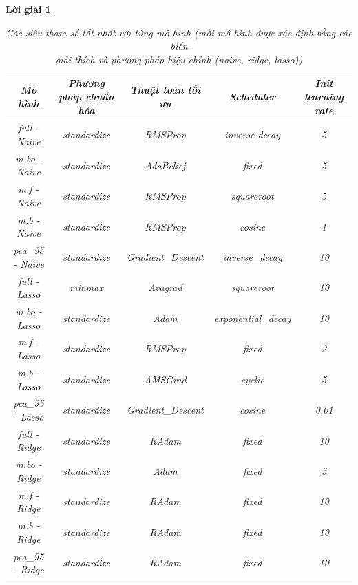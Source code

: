 \documentclass[14pt, a4paper]{article}
\theoremstyle{sltheorem}
\theoremstyle{soltheorem}
\newtheorem*{loigiai}{Lời giải}
\begin{document}
\begin{loigiai}
    \begin{table}[h!]
        \centering
        \begin{tabular}{|c | c | c | c | c |}
            \hline
            Mô hình & Phương pháp chuẩn hóa & Thuật toán tối ưu & Scheduler & Init learning rate \\
            \hline
            \hline
            full - Naive & standardize & RMSProp & inverse decay & 5 \\
            \hline
            m.bo - Naive & standardize & AdaBelief & fixed & 5 \\
            \hline
            m.f - Naive & standardize & RMSProp & squareroot &5 \\
            \hline
            m.b - Naive & standardize & RMSProp & cosine & 1 \\
            \hline
            pca\_95 - Naive & standardize & Gradient\_Descent & inverse\_decay & 10 \\
            \hline
            full - Lasso & minmax & Avagrad & squareroot & 10 \\
            \hline
            m.bo - Lasso & standardize & Adam & exponential\_decay & 10 \\
            \hline
            m.f - Lasso & standardize & RMSProp & fixed &2 \\
            \hline
            m.b - Lasso & standardize & AMSGrad & cyclic & 5 \\
            \hline
            pca\_95 - Lasso & standardize & Gradient\_Descent & cosine & 0.01 \\
            \hline
            full - Ridge & standardize & RAdam & fixed & 10 \\
            \hline
            m.bo - Ridge & standardize & Adam & fixed & 5 \\
            \hline
            m.f - Ridge & standardize & RAdam & fixed & 10 \\
            \hline
            m.b - Ridge & standardize & RAdam & fixed & 10 \\
            \hline
            pca\_95 - Ridge & standardize & RAdam & fixed & 10 \\
            \hline
        \end{tabular}
        \caption{Các siêu tham số tốt nhất với từng mô hình (mỗi mô hình được xác định bằng các biến \\ giải thích và phương pháp hiệu chỉnh (naive, ridge, lasso))}
        \label{tab:custom-hyperparameter-result}
    \end{table}



\end{loigiai}
\end{document}
